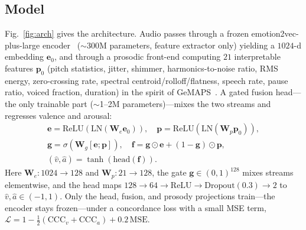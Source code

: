 \documentclass[conference]{IEEEtran}
\begin{document}
\subsection{Model}
Fig.~\ref{fig:arch} gives the architecture. Audio passes through a frozen
emotion2vec-plus-large encoder~\cite{emotion2vec} ($\sim$300M parameters, feature
extractor only) yielding a $1024$-d embedding $\mathbf{e}_0$, and through a
prosodic front-end computing $21$ interpretable features $\mathbf{p}_0$ (pitch
statistics, jitter, shimmer, harmonics-to-noise ratio, RMS energy, zero-crossing
rate, spectral centroid/rolloff/flatness, speech rate, pause ratio, voiced
fraction, duration) in the spirit of GeMAPS~\cite{gemaps}. A gated fusion
head---the only trainable part ($\sim$1--2M parameters)---mixes the two streams and
regresses valence and arousal:
\begin{equation}
\begin{gathered}
\mathbf{e} = \mathrm{ReLU}(\mathrm{LN}(\mathbf{W}_e\mathbf{e}_0)),\quad
\mathbf{p} = \mathrm{ReLU}(\mathrm{LN}(\mathbf{W}_p\mathbf{p}_0)),\\[2pt]
\mathbf{g} = \sigma(\mathbf{W}_g[\mathbf{e};\mathbf{p}]),\quad
\mathbf{f} = \mathbf{g}\odot\mathbf{e} + (1-\mathbf{g})\odot\mathbf{p},\\[2pt]
(\hat{v},\hat{a}) = \tanh(\mathrm{head}(\mathbf{f})).
\end{gathered}
\end{equation}
Here $\mathbf{W}_e\!:\!1024\!\to\!128$ and $\mathbf{W}_p\!:\!21\!\to\!128$, the
gate $\mathbf{g}\in(0,1)^{128}$ mixes streams elementwise, and the head maps
$128\!\to\!64\!\to\!\mathrm{ReLU}\!\to\!\mathrm{Dropout}(0.3)\!\to\!2$ to
$\hat{v},\hat{a}\in(-1,1)$. Only the head, fusion, and prosody projections
train---the encoder stays frozen---under a concordance loss with a small MSE term,
$\mathcal{L} = 1 - \tfrac{1}{2}(\mathrm{CCC}_v + \mathrm{CCC}_a) +
0.2\,\mathrm{MSE}$.
\end{document}
